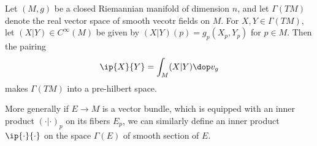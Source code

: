 \newpage

Let $(M,g)$ be a closed Riemannian manifold of dimension $n$, and let $\Gamma(TM)$ denote the real vector space of smooth vecotr fields on $M$. For $X,Y \in \Gamma(TM)$, let $(X|Y) \in C^\infty(M)$ be given by $(X|Y)(p) = g_p(X_p,Y_p)$ for $p \in M$. Then the pairing
\begin{align*}
    \ip{X}{Y} = \int_M (X|Y) \dop v_g
\end{align*}
makes $\Gamma(TM)$ into a pre-hilbert space.

More generally if $E \to M$ is a vector bundle, which is equipped with an inner product $(\cdot | \cdot)_p$ on its fibers $E_p$, we can similarly define an inner product $\ip{\cdot}{\cdot}$ on the space $\Gamma(E)$ of smooth section of $E$.


\newpage








